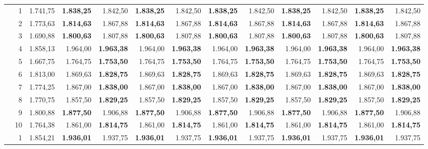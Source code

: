 \documentclass[11pt,a4paper]{article}
\begin{document}
\begin{table}[!htbp]
{\begin{tabular}{rrr rr rr rr rr rr}
\addlinespace
160 & 1 & 1.741{,}75 & \textbf{1.838{,}25} & 1.842{,}50 & \textbf{1.838{,}25} & 1.842{,}50 & \textbf{1.838{,}25} & 1.842{,}50 & \textbf{1.838{,}25} & 1.842{,}50 & \textbf{1.838{,}25} & 1.842{,}50 \\
 & 2 & 1.773{,}63 & \textbf{1.814{,}63} & 1.867{,}88 & \textbf{1.814{,}63} & 1.867{,}88 & \textbf{1.814{,}63} & 1.867{,}88 & \textbf{1.814{,}63} & 1.867{,}88 & \textbf{1.814{,}63} & 1.867{,}88 \\
 & 3 & 1.690{,}88 & \textbf{1.800{,}63} & 1.807{,}88 & \textbf{1.800{,}63} & 1.807{,}88 & \textbf{1.800{,}63} & 1.807{,}88 & \textbf{1.800{,}63} & 1.807{,}88 & \textbf{1.800{,}63} & 1.807{,}88 \\
 & 4 & 1.858{,}13 & 1.964{,}00 & \textbf{1.963{,}38} & 1.964{,}00 & \textbf{1.963{,}38} & 1.964{,}00 & \textbf{1.963{,}38} & 1.964{,}00 & \textbf{1.963{,}38} & 1.964{,}00 & \textbf{1.963{,}38} \\
 & 5 & 1.667{,}75 & 1.764{,}75 & \textbf{1.753{,}50} & 1.764{,}75 & \textbf{1.753{,}50} & 1.764{,}75 & \textbf{1.753{,}50} & 1.764{,}75 & \textbf{1.753{,}50} & 1.764{,}75 & \textbf{1.753{,}50} \\
 & 6 & 1.813{,}00 & 1.869{,}63 & \textbf{1.828{,}75} & 1.869{,}63 & \textbf{1.828{,}75} & 1.869{,}63 & \textbf{1.828{,}75} & 1.869{,}63 & \textbf{1.828{,}75} & 1.869{,}63 & \textbf{1.828{,}75} \\
 & 7 & 1.774{,}25 & 1.867{,}00 & \textbf{1.838{,}00} & 1.867{,}00 & \textbf{1.838{,}00} & 1.867{,}00 & \textbf{1.838{,}00} & 1.867{,}00 & \textbf{1.838{,}00} & 1.867{,}00 & \textbf{1.838{,}00} \\
 & 8 & 1.770{,}75 & 1.857{,}50 & \textbf{1.829{,}25} & 1.857{,}50 & \textbf{1.829{,}25} & 1.857{,}50 & \textbf{1.829{,}25} & 1.857{,}50 & \textbf{1.829{,}25} & 1.857{,}50 & \textbf{1.829{,}25} \\
 & 9 & 1.800{,}88 & \textbf{1.877{,}50} & 1.906{,}88 & \textbf{1.877{,}50} & 1.906{,}88 & \textbf{1.877{,}50} & 1.906{,}88 & \textbf{1.877{,}50} & 1.906{,}88 & \textbf{1.877{,}50} & 1.906{,}88 \\
 & 10 & 1.764{,}38 & 1.861{,}00 & \textbf{1.814{,}75} & 1.861{,}00 & \textbf{1.814{,}75} & 1.861{,}00 & \textbf{1.814{,}75} & 1.861{,}00 & \textbf{1.814{,}75} & 1.861{,}00 & \textbf{1.814{,}75} \\
\addlinespace
180 & 1 & 1.854{,}21 & \textbf{1.936{,}01} & 1.937{,}75 & \textbf{1.936{,}01} & 1.937{,}75 & \textbf{1.936{,}01} & 1.937{,}75 & \textbf{1.936{,}01} & 1.937{,}75 & \textbf{1.936{,}01} & 1.937{,}75 \\

\end{tabular}}
\end{table}
\end{document}
